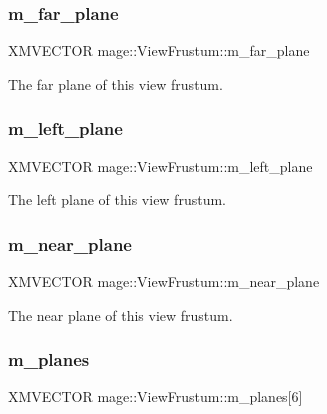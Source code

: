 \subsubsection{\texorpdfstring{m\+\_\+far\+\_\+plane}{m\_far\_plane}}
{\footnotesize\ttfamily X\+M\+V\+E\+C\+T\+OR mage\+::\+View\+Frustum\+::m\+\_\+far\+\_\+plane}

The far plane of this view frustum. \hypertarget{structmage_1_1_view_frustum_a07375137f59a785cf123c9feca08d393}{}\label{structmage_1_1_view_frustum_a07375137f59a785cf123c9feca08d393} 
\subsubsection{\texorpdfstring{m\+\_\+left\+\_\+plane}{m\_left\_plane}}
{\footnotesize\ttfamily X\+M\+V\+E\+C\+T\+OR mage\+::\+View\+Frustum\+::m\+\_\+left\+\_\+plane}

The left plane of this view frustum. \hypertarget{structmage_1_1_view_frustum_a3f8e1216b85b0f19839229c9cc9d97fb}{}\label{structmage_1_1_view_frustum_a3f8e1216b85b0f19839229c9cc9d97fb} 
\subsubsection{\texorpdfstring{m\+\_\+near\+\_\+plane}{m\_near\_plane}}
{\footnotesize\ttfamily X\+M\+V\+E\+C\+T\+OR mage\+::\+View\+Frustum\+::m\+\_\+near\+\_\+plane}

The near plane of this view frustum. \hypertarget{structmage_1_1_view_frustum_a671ec972dbd87a714cfd114a57d47949}{}\label{structmage_1_1_view_frustum_a671ec972dbd87a714cfd114a57d47949} 
\subsubsection{\texorpdfstring{m\+\_\+planes}{m\_planes}}
{\footnotesize\ttfamily X\+M\+V\+E\+C\+T\+OR mage\+::\+View\+Frustum\+::m\+\_\+planes\mbox{[}6\mbox{]}}

